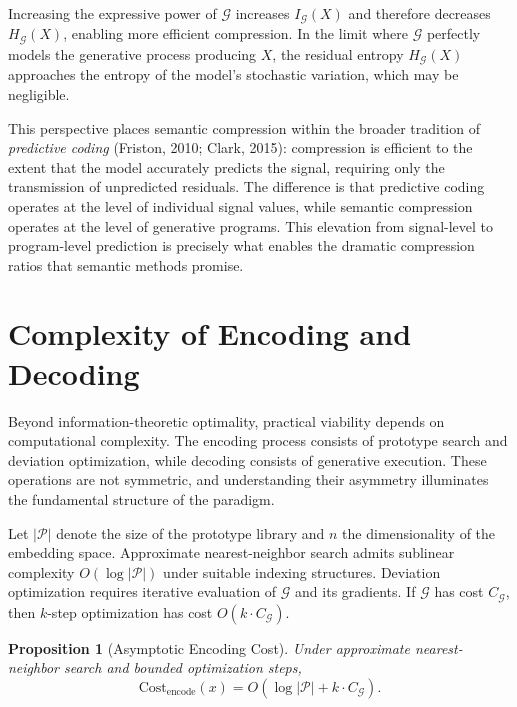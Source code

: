 \documentclass[11pt,a4paper]{article}
\newtheorem{proposition}[theorem]{Proposition}
\theoremstyle{definition}
\theoremstyle{remark}
\begin{document}
Increasing the expressive power of $\mathcal{G}$ increases $I_{\mathcal{G}}(X)$ and therefore decreases $H_{\mathcal{G}}(X)$, enabling more efficient compression. In the limit where $\mathcal{G}$ perfectly models the generative process producing $X$, the residual entropy $H_{\mathcal{G}}(X)$ approaches the entropy of the model's stochastic variation, which may be negligible.

This perspective places semantic compression within the broader tradition of \emph{predictive coding} (Friston, 2010; Clark, 2015): compression is efficient to the extent that the model accurately predicts the signal, requiring only the transmission of unpredicted residuals. The difference is that predictive coding operates at the level of individual signal values, while semantic compression operates at the level of generative programs. This elevation from signal-level to program-level prediction is precisely what enables the dramatic compression ratios that semantic methods promise.

\section{Complexity of Encoding and Decoding}
\label{sec:complexity}

Beyond information-theoretic optimality, practical viability depends on computational complexity. The encoding process consists of prototype search and deviation optimization, while decoding consists of generative execution. These operations are not symmetric, and understanding their asymmetry illuminates the fundamental structure of the paradigm.

Let $|\mathcal{P}|$ denote the size of the prototype library and $n$ the dimensionality of the embedding space. Approximate nearest-neighbor search admits sublinear complexity $O(\log |\mathcal{P}|)$ under suitable indexing structures. Deviation optimization requires iterative evaluation of $\mathcal{G}$ and its gradients. If $\mathcal{G}$ has cost $C_{\mathcal{G}}$, then $k$-step optimization has cost $O(k \cdot C_{\mathcal{G}})$.

\begin{proposition}[Asymptotic Encoding Cost]
Under approximate nearest-neighbor search and bounded optimization steps,
\[
\mathrm{Cost}_{\mathrm{encode}}(x) = O(\log |\mathcal{P}| + k \cdot C_{\mathcal{G}}).
\]
\end{proposition}
\end{document}
